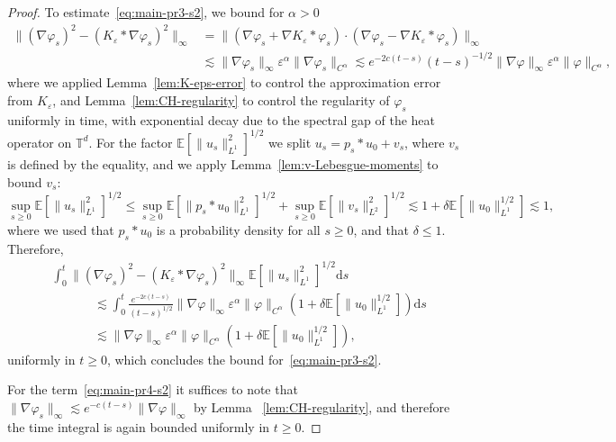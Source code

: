\documentclass[a4paper,12pt]{article}
\newcommand{\mathd}{\mathrm{d}}
\newcommand{\T}{\mathbb{T}}
\newcommand{\E}{\mathbb{E}}
\begin{document}
\begin{proof}
  To estimate~\eqref{eq:main-pr3-s2}, we bound for $\alpha > 0$
  \begin{align*}
    \| ( \nabla \varphi_s )^2 - ( K_{\varepsilon} \ast \nabla \varphi_s )^2
    \|_{\infty} & = \| (\nabla \varphi_s + \nabla K_{\varepsilon} \ast
    \varphi_s) \cdot (\nabla \varphi_s - \nabla K_{\varepsilon} \ast
    \varphi_s) \|_{\infty}\\
    & \lesssim \| \nabla \varphi_s \|_{\infty} \varepsilon^{\alpha} \|\nabla
    \varphi_s \|_{C^{\alpha}} \lesssim e^{-2c(t-s)}(t-s)^{-1/2} \| \nabla \varphi \|_{\infty} \varepsilon^{\alpha} \|
    \varphi \|_{C^{\alpha}},
  \end{align*}  
  where we applied Lemma~\ref{lem:K-eps-error} to control the approximation error from $K_\varepsilon$, and Lemma~\ref{lem:CH-regularity} to control the regularity of $\varphi_s$ uniformly in time, with exponential decay due to the spectral gap of the heat operator on $\T^d$. For the factor $\E[\| u_s \|_{L^1}^2]^{1 / 2}$ we  split $u_s = p_s\ast u_0 + v_s$, where $v_s$ is defined by the equality, and we apply Lemma~\ref{lem:v-Lebesgue-moments} to bound $v_s$:
  \[
     \sup_{s \geq 0} \mathbb{E} [\| u_s \|_{L^1}^2]^{1 / 2} \leq \sup_{s \geq 0} \mathbb{E} [\| p_s\ast u_0 \|_{L^1}^2]^{1 / 2} + \sup_{s \geq 0} \mathbb{E} [\| v_s \|_{L^2}^2]^{1 / 2} \lesssim 1 + \delta \E[\|u_0\|_{L^1}^{1/2}] \lesssim 1,
  \]
  where we used that $p_s\ast u_0$ is a probability density for all $s \geq 0$, and that $\delta \leq 1$. Therefore,
  \begin{align*}
    &\int_0^t \| (\nabla \varphi_s)^2 - ( K_{\varepsilon} \ast
    \nabla \varphi_s )^2 \|_{\infty} \mathbb{E} [\| u_s \|_{L^1}^2]^{1 / 2}
    \mathd s \\
    &\hspace{40pt} \lesssim \int_0^t \frac{e^{-2c(t-s)}}{(t-s)^{1/2}} \| \nabla \varphi \|_{\infty} \varepsilon^{\alpha} \|
    \varphi \|_{C^{\alpha}} ( 1 + \delta \E[\|u_0\|_{L^1}^{1/2}])\mathd s \\
    &\hspace{40pt} \lesssim \| \nabla \varphi \|_{\infty} \varepsilon^{\alpha} \|
    \varphi \|_{C^{\alpha}} ( 1 + \delta \E[\|u_0\|_{L^1}^{1/2}]),
  \end{align*}
  uniformly in $t\geq 0$, which concludes the bound for~\eqref{eq:main-pr3-s2}.

  For the term~\eqref{eq:main-pr4-s2} it suffices to note that $\|\nabla \varphi_s\|_\infty \lesssim e^{-c(t-s)}\|\nabla \varphi\|_\infty$ by Lemma~
  \ref{lem:CH-regularity},  and therefore the time integral is again bounded uniformly in $t \geq 0$.


\end{proof}
\end{document}
